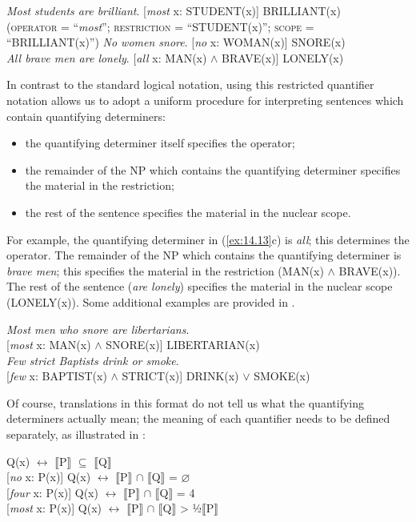 \ea \label{ex:14.13}
\ea \textit{Most students are brilliant}.  [\textit{most} x: STUDENT(x)] BRILLIANT(x)\\
\textsc{(operator} = “\textit{most}”; \textsc{restriction} = “STUDENT(x)”; \textsc{scope} = “BRILLIANT(x)”)
\ex  \textit{No women snore}.  [\textit{no} x: WOMAN(x)] SNORE(x)\\
\ex \textit{All brave men are lonely}.  [\textit{all} x: MAN(x) $\wedge$ BRAVE(x)] LONELY(x)
\z \z


In contrast to the standard logical notation, using this restricted quantifier notation allows us to adopt a uniform procedure for interpreting sentences which contain quantifying determiners:


\begin{itemize}
\item the quantifying determiner itself specifies the operator;
\item the remainder of the NP which contains the quantifying determiner specifies the material in the restriction;
\item the rest of the sentence specifies the material in the nuclear scope.
\end{itemize}

For example, the quantifying determiner in (\ref{ex:14.13}c) is \textit{all}; this determines the operator. The remainder of the NP which contains the quantifying determiner is \textit{brave men}; this specifies the material in the restriction (MAN(x) $\wedge$ BRAVE(x)). The rest of the sentence (\textit{are lonely}) specifies the material in the nuclear scope (LONELY(x)). Some additional examples are provided in .


\ea \label{ex:14.14}
\ea  \textit{Most men who snore are libertarians}.\\
  {}[\textit{most} x: MAN(x) $\wedge$ SNORE(x)] LIBERTARIAN(x)\\
\ex \textit{Few strict Baptists drink or smoke}.\\
  {}[\textit{few} x: BAPTIST(x) $\wedge$ STRICT(x)] DRINK(x) $\vee$ SMOKE(x)
                       \z
\z


Of course, translations in this format do not tell us what the quantifying determiners actually mean; the meaning of each quantifier needs to be defined separately, as illustrated in :


\ea \label{ex:14.15}
\ea {} Q(x)  $\leftrightarrow $  \textsc{$\llbracket$}P$\rrbracket$  ${\subseteq}$ \textsc{$\llbracket$}Q$\rrbracket$ \\
\ex{} [\textit{no} x: P(x)] Q(x)  $\leftrightarrow $  \textsc{$\llbracket$}P$\rrbracket$  ${\cap}$ \textsc{$\llbracket$}Q$\rrbracket$  = ⌀\\
\ex{} [\textit{four} x: P(x)] Q(x)  $\leftrightarrow $  {\textbar} \textsc{$\llbracket$}P$\rrbracket$  ${\cap}$ \textsc{$\llbracket$}Q$\rrbracket$  {\textbar}  = 4\\
\ex{} [\textit{most} x: P(x)] Q(x)  $\leftrightarrow $  {\textbar} \textsc{$\llbracket$}P$\rrbracket$  ${\cap}$ \textsc{$\llbracket$}Q$\rrbracket$  {\textbar}  >  ½\textsc{{\textbar}}\textsc{$\llbracket$}P$\rrbracket$ {\textbar}
                       \z
\z


